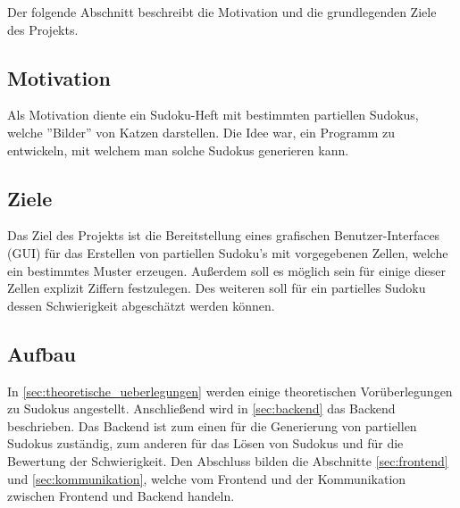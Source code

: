 Der folgende Abschnitt beschreibt die Motivation und die grundlegenden Ziele des Projekts.

\subsection{Motivation}
Als Motivation diente ein Sudoku-Heft mit bestimmten partiellen Sudokus,
welche ”Bilder” von Katzen darstellen.
Die Idee war, ein Programm zu entwickeln, mit welchem man solche Sudokus generieren kann.

\subsection{Ziele}
Das Ziel des Projekts ist die Bereitstellung eines grafischen Benutzer-Interfaces (GUI) für das Erstellen
von partiellen Sudoku’s mit vorgegebenen Zellen, welche ein bestimmtes Muster erzeugen.
Außerdem soll es möglich sein für einige dieser Zellen explizit Ziffern festzulegen.
Des weiteren soll für ein partielles Sudoku dessen Schwierigkeit abgeschätzt werden können.

\subsection{Aufbau}
In \cref{sec:theoretische_ueberlegungen} werden einige theoretischen Vorüberlegungen zu Sudokus angestellt.
Anschließend wird in \cref{sec:backend} das Backend beschrieben.
Das Backend ist zum einen für die Generierung von partiellen Sudokus zuständig,
zum anderen für das Lösen von Sudokus und für die Bewertung der Schwierigkeit.
Den Abschluss bilden die Abschnitte \cref{sec:frontend} und \cref{sec:kommunikation},
welche vom Frontend und der Kommunikation zwischen Frontend und Backend handeln.